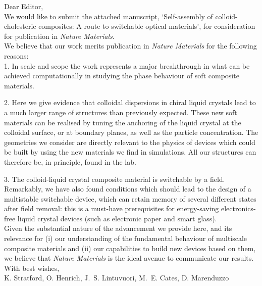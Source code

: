 \documentclass[12pt]{article}
\begin{document}
Dear Editor,\\

We would like to submit the attached manuscript, `Self-assembly of 
colloid-cholesteric composites: A route to switchable optical materials', 
for consideration for publication in {\it Nature Materials}. \\

We believe that our work merits publication in {\it Nature Materials} for the following reasons:\\

1. In scale and scope the work represents a major breakthrough in what 
can be achieved computationally in studying the phase behaviour of soft 
composite materials. 

2. Here we give evidence that colloidal dispersions in chiral liquid 
crystals lead to a much larger range of structures than previously
expected. These new soft materials can be realised by tuning
the anchoring of the liquid crystal at the colloidal surface,
or at boundary planes, as well as the particle concentration. 
The geometries we consider are directly 
relevant to the physics of devices which could be built by
using the new materials we find in simulations. All our
structures can therefore be, in principle, found in the lab.

3.  The colloid-liquid crystal composite material is switchable
by a field. Remarkably, we have also found conditions which should
lead to the design of a multistable switchable device, which can
retain memory of several different states after field removal:
this is a must-have prerequisites for energy-saving electronics-free
liquid crystal devices (such as electronic paper and smart glass).\\

Given the substantial nature of the advancement we provide here, 
and its relevance for (i) our understanding of the fundamental behaviour
of multiscale composite materials and (ii) our capabilities to build new
devices based on them, we believe that {\it Nature Materials}
is the ideal avenue to communicate our results.\\

With best wishes,\\

K. Stratford, O. Henrich, J.~S. Lintuvuori, M.~E. Cates, D. Marenduzzo
\end{document}
